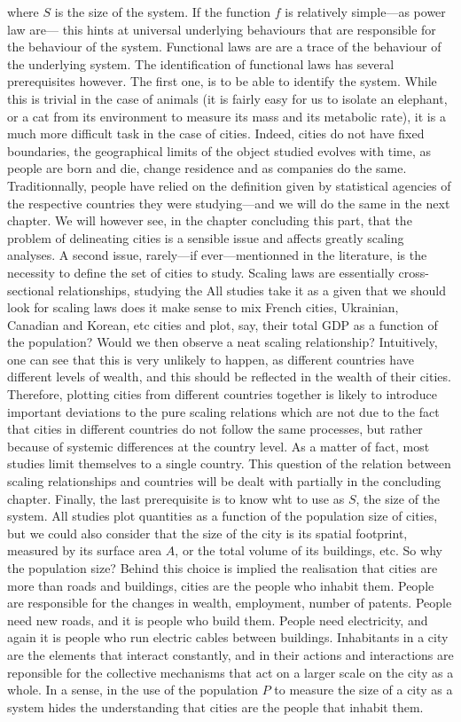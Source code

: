 where $S$ is the size of the system. If the function $f$ is relatively
simple---as power law are--- this hints at universal underlying behaviours that
are responsible for the behaviour of the system. Functional laws are are a trace
of the behaviour of the underlying system. The identification of functional laws
has several prerequisites however. The first one, is to be able to identify the
system. While this is trivial in the case of animals (it is fairly easy for us
to isolate an elephant, or a cat from its environment to measure its mass and
its metabolic rate), it is a much more difficult task in the case of cities.
Indeed, cities do not have fixed boundaries, the geographical limits of the
object studied evolves with time, as people are born and die, change residence
and as companies do the same. Traditionnally, people have relied on the
definition given by statistical agencies of the respective countries they were
studying---and we will do the same in the next chapter. We will however see, in
the chapter concluding this part, that the problem of delineating cities is a
sensible issue and affects greatly scaling analyses. A second issue, rarely---if
ever---mentionned in the literature, is the necessity to define the set of
cities to study. Scaling laws are essentially cross-sectional relationships,
studying the All studies take it as a given that we should look for scaling laws
does it make sense to mix French cities, Ukrainian, Canadian and Korean, etc
cities and plot, say, their total GDP as a function of the population? Would we
then observe a neat scaling relationship? Intuitively, one can see that this is
very unlikely to happen, as different countries have different levels of wealth,
and this should be reflected in the wealth of their cities. Therefore, plotting
cities from different countries together is likely to introduce important
deviations to the pure scaling relations which are not due to the fact that
cities in different countries do not follow the same processes, but rather
because of systemic differences at the country level. As a matter of fact, most
studies limit themselves to a single country. This question of the relation
between scaling relationships and countries will be dealt with partially in the
concluding chapter.  Finally, the last prerequisite is to know wht to use as
$S$, the size of the system. All studies plot quantities as a function of the
population size of cities, but we could also consider that the size of the city
is its spatial footprint, measured by its surface area $A$, or the total volume
of its buildings, etc. So why the population size? Behind this choice is implied
the realisation that cities are more than roads and buildings, cities are the
people who inhabit them. People are responsible for the changes in wealth,
employment, number of patents. People need new roads, and it is people who build
them. People need electricity, and again it is people who run electric cables
between buildings. Inhabitants in a city are the elements that interact
constantly, and in their actions and interactions are reponsible for the
collective mechanisms that act on a larger scale on the city as a whole. In a
sense, in the use of the population $P$ to measure the size of a city as a
system hides the understanding that cities are the people that inhabit them.

